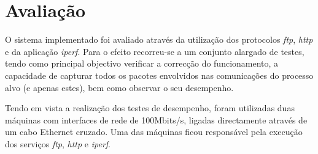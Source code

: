 









\section{Avaliação}
\label{sec:evaluation}

O sistema implementado foi avaliado através da utilização dos protocolos \textit{ftp}, \textit{http} e da aplicação \textit{iperf}\cite{iperf}.
 Para o efeito recorreu-se a um conjunto alargado de testes, tendo como principal objectivo verificar a correcção do funcionamento, a capacidade de capturar todos os pacotes envolvidos nas comunicações do processo alvo (e apenas estes), bem como observar o seu desempenho.

Tendo em vista a realização dos testes de desempenho, foram utilizadas duas máquinas com interfaces de rede de 100Mbits/s, ligadas directamente através de um cabo Ethernet cruzado.
Uma das máquinas ficou responsável pela execução dos serviços \textit{ftp}, \textit{http} e \textit{iperf}.

